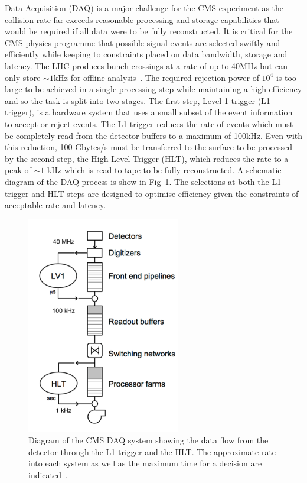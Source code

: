 Data Acquisition (DAQ) is a major challenge for the CMS experiment as the collision rate far exceeds reasonable processing 
and storage capabilities that would be required if all data were to be fully reconstructed. It is critical
for the CMS physics programme that 
possible signal events are selected swiftly and efficiently while keeping to constraints placed on data bandwidth, storage and 
latency. The LHC produces bunch crossings at a rate of up to 40MHz but can only
store $\sim1$kHz for offline analysis~\cite{daq_tdr}. The required rejection power of $10^4$ is too large to be achieved
in a single processing step while maintaining a high efficiency and so the task is split into two stages.
The first step, Level-1 trigger (L1 trigger), is a hardware system that uses a small subset of the event information
to accept or reject events. The L1 trigger reduces the rate of events which must be completely 
read from the detector buffers to a maximum of 100kHz. Even with this reduction, 100 Gbytes/s must be transferred to the surface
to be processed by the second step, the High Level Trigger (HLT), which reduces the rate to a peak of $\sim1$ kHz which is 
read to tape to be fully reconstructed. A schematic diagram of the DAQ process is show in Fig~\ref{fig:DAQ_SLICE}. 
The selections at both the L1 trigger and HLT steps are designed to optimise efficiency given the constraints 
of acceptable rate and latency.

\begin{figure}
\centering
    \includegraphics[width=0.6\textwidth]{./Figures/detector/daq_sys}
  \caption{Diagram of the CMS DAQ system showing the data flow from the detector through the L1 trigger
and the HLT. The approximate rate into each system as well as the maximum time for a decision are indicated~\cite{daq_tdr}.}
  \label{fig:DAQ_SLICE}
\end{figure}

